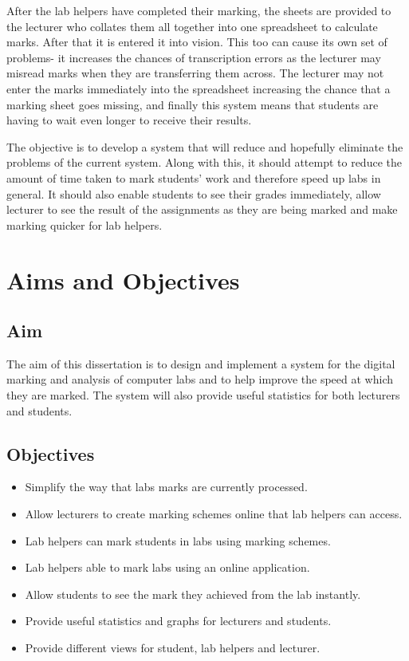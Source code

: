 \documentclass[12pt]{article}  %
\begin{document}
After the lab helpers have completed their marking, the sheets are provided to the lecturer who collates them all together into one spreadsheet to calculate marks. After that it is entered it into vision. This too can cause its own set of problems- it increases the chances of transcription errors as the lecturer may misread marks when they are transferring them across. The lecturer may not enter the marks immediately into the spreadsheet increasing the chance that a marking sheet goes missing, and finally this system means that students are having to wait even longer to receive their results.

The objective is to develop a system that will reduce and hopefully eliminate the problems of the current system. Along with this, it should attempt to reduce the amount of time taken to mark students’ work and therefore speed up labs in general. It should also enable students to see their grades immediately, allow lecturer to see the result of the assignments as they are being marked and make marking quicker for lab helpers.




\newpage
\section{Aims and Objectives}
\subsection{Aim}
The aim of this dissertation is to design and implement a system for the digital marking and analysis of computer labs and to help improve the speed at which they are marked. The system will also provide useful statistics for both lecturers and students.

\subsection{Objectives}
\label{section:object}
\begin{itemize}
\item Simplify the way that labs marks are currently processed.
\item Allow lecturers to create marking schemes online that lab helpers can access. 
\item Lab helpers can mark students in labs using marking schemes.
\item Lab helpers able  to mark labs using an online application.
\item Allow students to see the mark they achieved from the lab instantly.
\item Provide useful statistics and graphs for lecturers and students.
\item Provide different views for student, lab helpers and lecturer.
\end{itemize}
\end{document}
